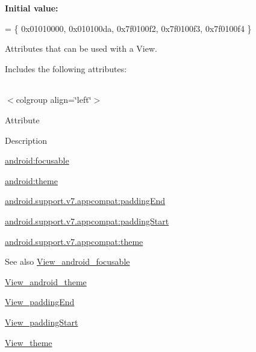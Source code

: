 {\bfseries Initial value\+:}
\begin{DoxyCode}
= \{
            0x01010000, 0x010100da, 0x7f0100f2, 0x7f0100f3,
            0x7f0100f4
        \}
\end{DoxyCode}
Attributes that can be used with a View. 

Includes the following attributes\+:

\tabulinesep=1mm
\begin{longtabu} spread 0pt [c]{*{0}{|X[-1]}|}
\hline
\end{longtabu}
$<$colgroup align=\char`\"{}left\char`\"{}$>$ 

Attribute

Description 

{\ttfamily \hyperlink{classandroid_1_1support_1_1v7_1_1appcompat_1_1R_1_1styleable_a0d7d9839026cd18de7e33d7095851319}{android\+:focusable}}

{\ttfamily \hyperlink{classandroid_1_1support_1_1v7_1_1appcompat_1_1R_1_1styleable_a399af2d06b82d2a76a27c8a307effed1}{android\+:theme}}

{\ttfamily \hyperlink{classandroid_1_1support_1_1v7_1_1appcompat_1_1R_1_1styleable_a460b0b2b58042d9f069bb69a7abee61b}{android.\+support.\+v7.\+appcompat\+:padding\+End}}

{\ttfamily \hyperlink{classandroid_1_1support_1_1v7_1_1appcompat_1_1R_1_1styleable_a6a45d688c5e562564bd4ea8e8a8009da}{android.\+support.\+v7.\+appcompat\+:padding\+Start}}

{\ttfamily \hyperlink{classandroid_1_1support_1_1v7_1_1appcompat_1_1R_1_1styleable_a12b9f90d53fd9f125f955389e1951751}{android.\+support.\+v7.\+appcompat\+:theme}}

\begin{DoxySeeAlso}{See also}
\hyperlink{classandroid_1_1support_1_1v7_1_1appcompat_1_1R_1_1styleable_a0d7d9839026cd18de7e33d7095851319}{View\+\_\+android\+\_\+focusable} 

\hyperlink{classandroid_1_1support_1_1v7_1_1appcompat_1_1R_1_1styleable_a399af2d06b82d2a76a27c8a307effed1}{View\+\_\+android\+\_\+theme} 

\hyperlink{classandroid_1_1support_1_1v7_1_1appcompat_1_1R_1_1styleable_a460b0b2b58042d9f069bb69a7abee61b}{View\+\_\+padding\+End} 

\hyperlink{classandroid_1_1support_1_1v7_1_1appcompat_1_1R_1_1styleable_a6a45d688c5e562564bd4ea8e8a8009da}{View\+\_\+padding\+Start} 

\hyperlink{classandroid_1_1support_1_1v7_1_1appcompat_1_1R_1_1styleable_a12b9f90d53fd9f125f955389e1951751}{View\+\_\+theme} 
\end{DoxySeeAlso}
\mbox{\label{classandroid_1_1support_1_1v7_1_1appcompat_1_1R_1_1styleable_a0d7d9839026cd18de7e33d7095851319}} 
